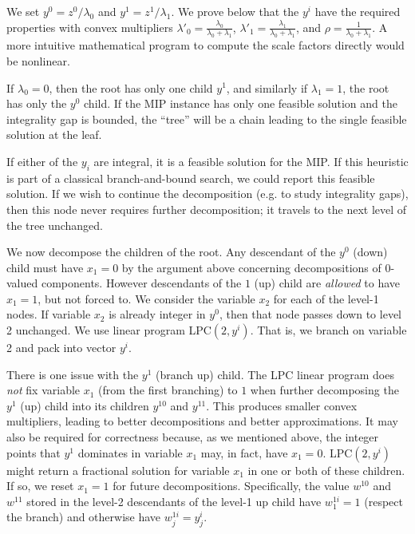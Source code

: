 \documentclass[11pt]{article}
\begin{document}
We set $y^0 = z^0/\lambda_0$ and $y^1 = z^1/\lambda_1$.  We prove
below that the $y^i$ have the required properties with convex
multipliers $\lambda'_0 = \frac{\lambda_0}{\lambda_0 + \lambda_1}$,
$\lambda'_1 = \frac{\lambda_1}{\lambda_0 + \lambda_1}$, and $\rho =
\frac{1}{\lambda_0 + \lambda_1}$.  A more intuitive mathematical
program to compute the scale factors directly would be nonlinear.

If $\lambda_0 = 0$, then the root has only one child $y^1$, and
similarly if $\lambda_1 = 1$, the root has only the $y^0$ child.  If
the MIP instance has only one feasible solution and the integrality gap
is bounded, the ``tree'' will be a chain leading to the single
feasible solution at the leaf.

If either of the $y_i$ are integral, it is a feasible solution for the
MIP.  If this heuristic is part of a classical branch-and-bound
search, we could report this feasible solution.  If we wish to
continue the decomposition (e.g. to study integrality gaps), then this
node never requires further decomposition; it travels to the next level
of the tree unchanged.

We now decompose the children of the root.  Any descendant of the
$y^0$ (down) child must have $x_1 = 0$ by the argument above
concerning decompositions of $0$-valued components.  However
descendants of the $1$ (up) child are {\em allowed} to have $x_1 = 1$,
but not forced to.  We consider the variable $x_2$ for each of the
level-1 nodes.  If variable $x_2$ is already integer in $y^0$, then
that node passes down to level 2 unchanged.  We use linear program
LPC$(2,y^i)$.  That is, we branch on variable 2 and pack into vector $y^i$.

There is one issue with the $y^1$ (branch up) child. The LPC linear
program does {\em not} fix variable $x_1$ (from the first branching)
to $1$ when further decomposing the $y^1$ (up) child into its children
$y^{10}$ and $y^{11}$.  This produces smaller convex multipliers,
leading to better decompositions and better approximations.  It may
also be required for correctness because, as we mentioned above, the
integer points that $y^1$ dominates in variable $x_1$ may, in fact,
have $x_1 = 0$.  LPC$(2,y^i)$ might return a fractional solution for variable
$x_1$ in one or both of these children.  If so, we reset $x_1 = 1$ for
future decompositions.  Specifically, the value $w^{10}$ and $w^{11}$
stored in the level-2 descendants of the level-1 up child have
$w^{1i}_1 = 1$ (respect the branch) and otherwise have $w^{1i}_j =
y^i_j$.
\end{document}
